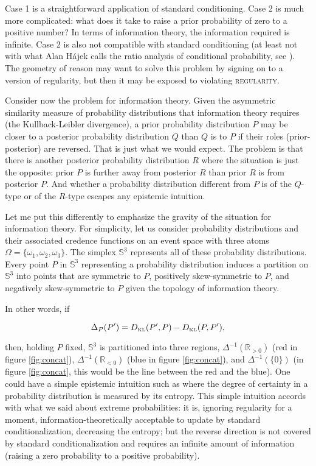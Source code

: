 \documentclass[11pt]{article} \usepackage{october} \onehalfspacing
\begin{document}
Case 1 is a straightforward application of standard conditioning. Case
2 is much more complicated: what does it take to raise a prior
probability of zero to a positive number? In terms of information
theory, the information required is infinite. Case 2 is also not
compatible with standard conditioning (at least not with what Alan
H{\'a}jek calls the ratio analysis of conditional probability, see
). The geometry of reason may want to solve this
problem by signing on to a version of regularity, but then it may be
exposed to violating \textsc{regularity}.

Consider now the problem for information theory. Given the asymmetric
similarity measure of probability distributions that information
theory requires (the Kullback-Leibler divergence), a prior probability
distribution $P$ may be closer to a posterior probability distribution
$Q$ than $Q$ is to $P$ if their roles (prior-posterior) are reversed.
That is just what we would expect. The problem is that there is
another posterior probability distribution $R$ where the situation is
just the opposite: prior $P$ is further away from posterior $R$ than
prior $R$ is from posterior $P$. And whether a probability
distribution different from $P$ is of the $Q$-type or of the $R$-type
escapes any epistemic intuition.

Let me put this differently to emphasize the gravity of the situation
for information theory. For simplicity, let us consider probability
distributions and their associated credence functions on an event
space with three atoms $\Omega=\{\omega_{1},\omega_{2},\omega_{3}\}$.
The simplex $\mathbb{S}^{3}$ represents all of these probability
distributions. Every point $P$ in $\mathbb{S}^{3}$ representing a
probability distribution induces a partition on $\mathbb{S}^{3}$ into
points that are symmetric to $P$, positively skew-symmetric to $P$,
and negatively skew-symmetric to $P$ given the topology of information
theory.

In other words, if

\begin{equation}
  \label{eq:sksy}
  \Delta_{P}(P')=D_{\mbox{\tiny KL}}(P',P)-D_{\mbox{\tiny KL}}(P,P'),
\end{equation}

then, holding $P$ fixed, $\mathbb{S}^{3}$ is partitioned into three
regions, $\Delta^{-1}(\mathbb{R}_{>0})$ (red in figure
\ref{fig:concat}), $\Delta^{-1}(\mathbb{R}_{<0})$ (blue in figure
\ref{fig:concat}), and $\Delta^{-1}(\{0\})$ (in figure
\ref{fig:concat}, this would be the line between the red and the
blue). One could have a simple epistemic intuition such as  where the degree of certainty in a probability
distribution is measured by its entropy. This simple intuition accords
with what we said about extreme probabilities: it is, ignoring
regularity for a moment, information-theoretically acceptable to
update by standard conditionalization, decreasing the entropy; but the
reverse direction is not covered by standard conditionalization and
requires an infinite amount of information (raising a zero probability
to a positive probability).
\end{document}
